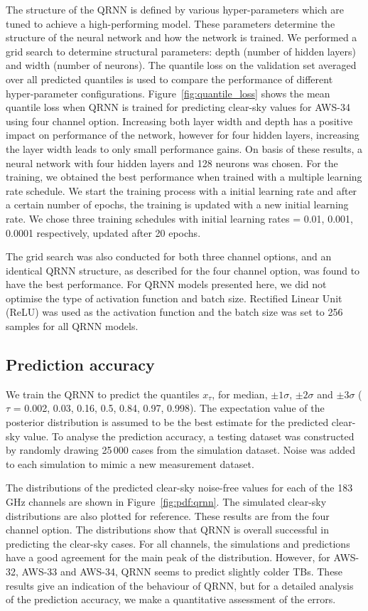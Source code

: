 \documentclass[12pt]{article}
\begin{document}
The structure of the QRNN is defined by various hyper-parameters which are
tuned to achieve a high-performing model. These parameters determine the
structure of the neural network and how the network is trained. We performed a
grid search to determine structural parameters: depth (number of hidden layers)
and width (number of neurons). The quantile loss on the validation set averaged
over all predicted quantiles is used to compare the performance of different
hyper-parameter configurations. Figure~\ref{fig:quantile_loss} shows the mean
quantile loss when QRNN is trained for predicting clear-sky values for AWS-34
using four channel option. Increasing both layer width and depth has a positive
impact on performance of the network, however for four hidden layers,
increasing the layer width leads to only small performance gains. On basis of
these results, a neural network with four hidden layers and 128 neurons was
chosen. For the training, we obtained the best performance when trained with a
multiple learning rate schedule. We start the training process with a initial
learning rate and after a certain number of epochs, the training is updated
with a new initial learning rate. We chose three training schedules with
initial learning rates = 0.01, 0.001, 0.0001 respectively, updated after 20
epochs.

The grid search was also conducted for both three channel options, and an identical QRNN structure, as described for the four channel option, was found to have the best performance. For QRNN models presented here, we did not optimise the type of activation function and batch size. Rectified Linear Unit (ReLU) was used as the activation function  and the batch size was set to 256 samples for all QRNN models.   


\subsection{Prediction accuracy}
%
We train the QRNN to predict the quantiles $x_{\tau}$, for median, $\pm 1\sigma$, $\pm 2 \sigma$ and  $\pm 3 \sigma$ ($\tau$ = 0.002, 0.03, 0.16, 0.5, 0.84, 0.97, 0.998). The expectation value of the posterior distribution is assumed to be the best estimate for the predicted clear-sky value. To analyse the prediction accuracy, a testing dataset was constructed by randomly drawing 25\,000 cases from the simulation dataset. Noise was added to each simulation to mimic a new measurement dataset. 

The distributions of the predicted clear-sky noise-free values for each of the
183\, GHz channels are shown in Figure~\ref{fig:pdf:qrnn}. The simulated
clear-sky distributions are also plotted for reference. These results are from
the four channel option. The distributions show that QRNN is overall successful in
predicting the clear-sky cases. For all channels, the simulations and
predictions have a good agreement for the main peak of the distribution.
However, for AWS-32, AWS-33 and AWS-34, QRNN seems to predict slightly colder
TBs. These results give an indication of the behaviour of QRNN, but for a
detailed analysis of the prediction accuracy, we make a quantitative assessment
of the errors.
\end{document}
